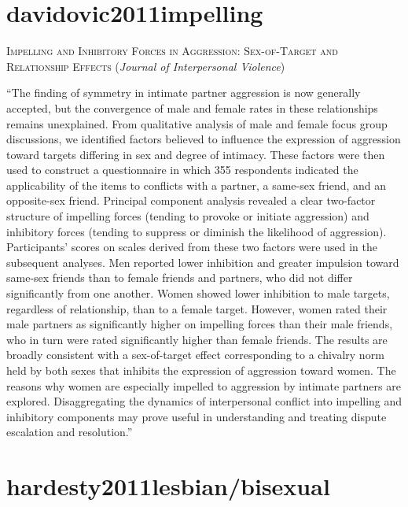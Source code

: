 \documentclass[]{tufte-handout}
\begin{document}
\section{\texorpdfstring{\textcolor[HTML]{5b0057}{davidovic2011impelling}}{}}\label{section-43}

\textsc{\large{Impelling and Inhibitory Forces in Aggression: Sex-of-Target and Relationship Effects}}
(\emph{Journal of Interpersonal Violence})

``The finding of symmetry in intimate partner aggression is now
generally accepted, but the convergence of male and female rates in
these relationships remains unexplained. From qualitative analysis of
male and female focus group discussions, we identified factors believed
to influence the expression of aggression toward targets differing in
sex and degree of intimacy. These factors were then used to construct a
questionnaire in which 355 respondents indicated the applicability of
the items to conflicts with a partner, a same-sex friend, and an
opposite-sex friend. Principal component analysis revealed a clear
two-factor structure of impelling forces (tending to provoke or initiate
aggression) and inhibitory forces (tending to suppress or diminish the
likelihood of aggression). Participants' scores on scales derived from
these two factors were used in the subsequent analyses. Men reported
lower inhibition and greater impulsion toward same-sex friends than to
female friends and partners, who did not differ significantly from one
another. Women showed lower inhibition to male targets, regardless of
relationship, than to a female target. However, women rated their male
partners as significantly higher on impelling forces than their male
friends, who in turn were rated significantly higher than female
friends. The results are broadly consistent with a sex-of-target effect
corresponding to a chivalry norm held by both sexes that inhibits the
expression of aggression toward women. The reasons why women are
especially impelled to aggression by intimate partners are explored.
Disaggregating the dynamics of interpersonal conflict into impelling and
inhibitory components may prove useful in understanding and treating
dispute escalation and resolution.''

\section{\texorpdfstring{\textcolor[HTML]{5b0057}{hardesty2011lesbian/bisexual}}{}}\label{section-44}
\end{document}

